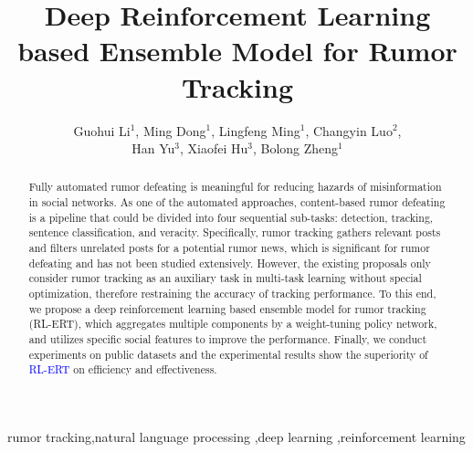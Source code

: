 \documentclass[review]{elsarticle}
\begin{document}
\begin{frontmatter}

\title{Deep Reinforcement Learning based Ensemble Model for Rumor Tracking}

\author{Guohui Li$^1$, Ming Dong$^1$, Lingfeng Ming$^1$, Changyin Luo$^2$,\\Han Yu$^3$, Xiaofei Hu$^3$, Bolong Zheng$^1$}
\address{$^1$Huazhong University of Science and Technology, Wuhan, China}
\address{$^2$Central China Normal University, Wuhan, China}
\address{$^3$Wuhan Fiberhome Technical Services Co.,Ltd, Wuhan, China}


\begin{abstract} 
	Fully automated rumor defeating is meaningful for reducing hazards of misinformation in social networks.
	As one of the automated approaches, content-based rumor defeating is a pipeline that could be divided into four sequential sub-tasks: detection, tracking, sentence classification, and veracity. 
	Specifically, rumor tracking gathers relevant posts and filters unrelated posts for a potential rumor news, which is significant for rumor defeating and has not been studied extensively. However, the existing proposals only consider rumor tracking as an auxiliary task in multi-task learning without special optimization, therefore restraining the accuracy of tracking performance. 
	To this end, we propose a deep reinforcement learning based ensemble model for rumor tracking (RL-ERT), which aggregates multiple components by a weight-tuning policy network, and utilizes specific social features to improve the performance.
	Finally, we conduct experiments on public datasets and the experimental results show the superiority of \textcolor{blue}{RL-ERT} on efficiency and effectiveness.
\end{abstract}

\begin{keyword}
rumor tracking\sep natural language processing \sep deep learning \sep reinforcement learning
\end{keyword}

\end{frontmatter}

\linenumbers
\end{document}
